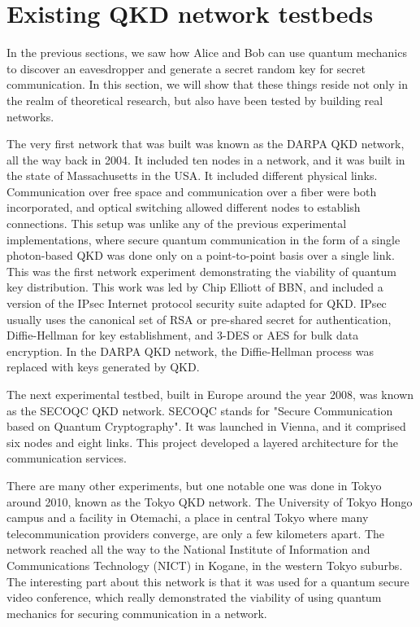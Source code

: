
\section{Existing QKD network testbeds}


In the previous sections, we saw how Alice and Bob can use quantum mechanics to discover an eavesdropper and generate a secret random key for secret communication. In this section, we will show that these things reside not only in the realm of theoretical research, but also have been tested by building real networks.

The very first network that was built was known as the DARPA QKD network, all the way back in 2004. It included ten nodes in a network, and it was built in the state of Massachusetts in the USA. It included different physical links. Communication over free space and communication over a fiber were both incorporated, and optical switching allowed different nodes to establish connections. This setup was unlike any of the previous experimental implementations, where secure quantum communication in the form of a single photon-based QKD was done only on a point-to-point basis over a single link. This was the first network experiment demonstrating the viability of quantum key distribution.  This work was led by Chip Elliott of BBN, and included a version of the IPsec Internet protocol security suite adapted for QKD.  IPsec usually uses the canonical set of RSA or pre-shared secret for authentication, Diffie-Hellman for key establishment, and 3-DES or AES for bulk data encryption.  In the DARPA QKD network, the Diffie-Hellman process was replaced with keys generated by QKD.

The next experimental testbed, built in Europe around the year 2008, was known as the SECOQC QKD network. SECOQC stands for "Secure Communication based on Quantum Cryptography". It was launched in Vienna, and it comprised six nodes and eight links. This project developed a layered architecture for the communication services.

There are many other experiments, but one notable one was done in Tokyo around 2010, known as the Tokyo QKD network. The University of Tokyo Hongo campus and a facility in Otemachi, a place in central Tokyo where many telecommunication providers converge, are only a few kilometers apart.  The network reached all the way to the National Institute of Information and Communications Technology (NICT) in Kogane, in the western Tokyo suburbs. The interesting part about this network is that it was used for a quantum secure video conference, which really demonstrated the viability of using quantum mechanics for securing communication in a network.

